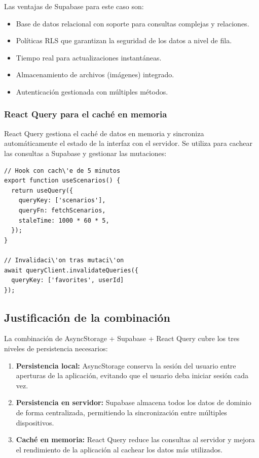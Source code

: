 Las ventajas de Supabase para este caso son:

\begin{itemize}
  \item Base de datos relacional con soporte para consultas
    complejas y relaciones.
  \item Pol\'iticas RLS que garantizan la seguridad de los datos
    a nivel de fila.
  \item Tiempo real para actualizaciones instant\'aneas.
  \item Almacenamiento de archivos (im\'agenes) integrado.
  \item Autenticaci\'on gestionada con m\'ultiples m\'etodos.
\end{itemize}

\subsubsection{React Query para el cach\'e en memoria}

React Query gestiona el cach\'e de datos en memoria y sincroniza
autom\'aticamente el estado de la interfaz con el servidor. Se
utiliza para cachear las consultas a Supabase y gestionar las
mutaciones:

\begin{lstlisting}
// Hook con cach\'e de 5 minutos
export function useScenarios() {
  return useQuery({
    queryKey: ['scenarios'],
    queryFn: fetchScenarios,
    staleTime: 1000 * 60 * 5,
  });
}

// Invalidaci\'on tras mutaci\'on
await queryClient.invalidateQueries({
  queryKey: ['favorites', userId]
});
\end{lstlisting}

\subsection{Justificaci\'on de la combinaci\'on}

La combinaci\'on de AsyncStorage + Supabase + React Query cubre
los tres niveles de persistencia necesarios:

\begin{enumerate}
  \item \textbf{Persistencia local:} AsyncStorage conserva la
    sesi\'on del usuario entre aperturas de la aplicaci\'on,
    evitando que el usuario deba iniciar sesi\'on cada vez.

  \item \textbf{Persistencia en servidor:} Supabase almacena
    todos los datos de dominio de forma centralizada, permitiendo
    la sincronizaci\'on entre m\'ultiples dispositivos.

  \item \textbf{Cach\'e en memoria:} React Query reduce las
    consultas al servidor y mejora el rendimiento de la
    aplicaci\'on al cachear los datos m\'as utilizados.
\end{enumerate}
